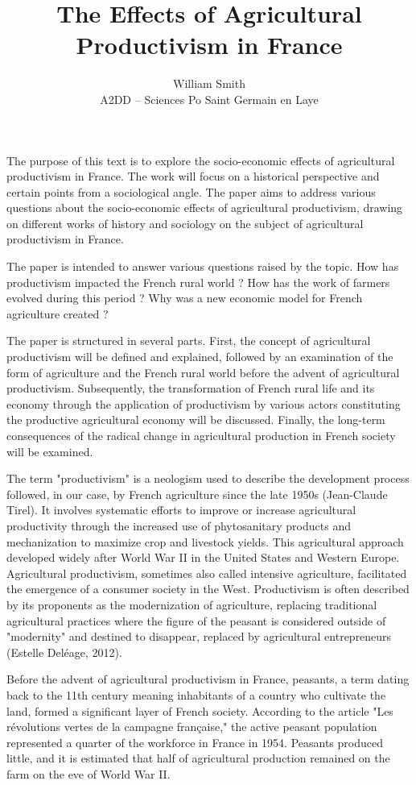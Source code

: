 \documentclass[12pt]{article}
\title{The Effects of Agricultural Productivism in France}
\author{William Smith \\ A2DD – Sciences Po Saint Germain en Laye}
\date{}
\begin{document}
\maketitle
\onehalfspacing
\noindent





The purpose of this text is to explore the socio-economic effects of agricultural productivism in France. The work will focus on a historical perspective and certain points from a sociological angle. The paper aims to address various questions about the socio-economic effects of agricultural productivism, drawing on different works of history and sociology on the subject of agricultural productivism in France.

The paper is intended to answer various questions raised by the topic. How has productivism impacted the French rural world ? How has the work of farmers evolved during this period ? Why was a new economic model for French agriculture created ?

The paper is structured in several parts. First, the concept of agricultural productivism will be defined and explained, followed by an examination of the form of agriculture and the French rural world before the advent of agricultural productivism. Subsequently, the transformation of French rural life and its economy through the application of productivism by various actors constituting the productive agricultural economy will be discussed. Finally, the long-term consequences of the radical change in agricultural production in French society will be examined.

The term "productivism" is a neologism used to describe the development process followed, in our case, by French agriculture since the late 1950s (Jean-Claude Tirel). It involves systematic efforts to improve or increase agricultural productivity through the increased use of phytosanitary products and mechanization to maximize crop and livestock yields. This agricultural approach developed widely after World War II in the United States and Western Europe. Agricultural productivism, sometimes also called intensive agriculture, facilitated the emergence of a consumer society in the West. Productivism is often described by its proponents as the modernization of agriculture, replacing traditional agricultural practices where the figure of the peasant is considered outside of "modernity" and destined to disappear, replaced by agricultural entrepreneurs (Estelle Deléage, 2012).

Before the advent of agricultural productivism in France, peasants, a term dating back to the 11th century meaning inhabitants of a country who cultivate the land, formed a significant layer of French society. According to the article "Les révolutions vertes de la campagne française," the active peasant population represented a quarter of the workforce in France in 1954. Peasants produced little, and it is estimated that half of agricultural production remained on the farm on the eve of World War II.
\end{document}
